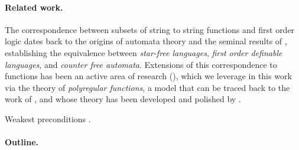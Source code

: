 \begin{center}
\end{center}

\paragraph{Related work.} The correspondence between subsets of string to
string functions and first order logic dates back to the origins of automata
theory and the seminal results of \cite{PEPI86,SCHU65,MNPA71}, establishing the
equivalence between \emph{star-free languages}, \emph{first order definable
languages}, and \emph{counter free automata}. Extensions of this correspondence
to functions has been an active area of research (\cite{CADA15,MUSC19}), which
we leverage in this work via the theory of \emph{polyregular functions}, a
model that can be traced back to the work of \cite{ENMA02}, and whose theory
has been developed and polished by \cite{bojanczyk2018polyregular}.

Weakest preconditions \cite[Chapter 7]{WINSKEL93}.


\paragraph{Outline.}



